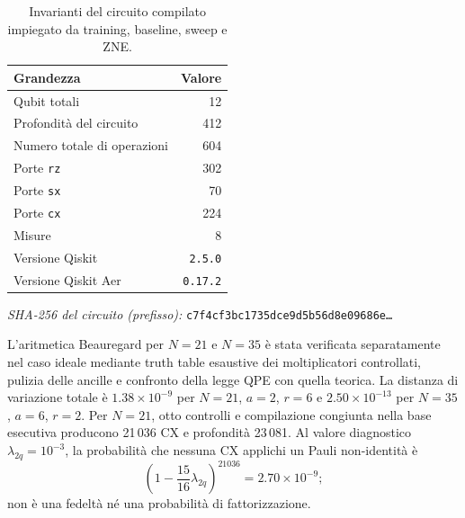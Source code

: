 \begin{onehalfspace}
\begin{table}[H]
\centering

\small
\begin{tabularx}{0.85\textwidth}{@{}>{\raggedright\arraybackslash}Xr@{}}
\toprule
\textbf{Grandezza} & \textbf{Valore} \\
\midrule
Qubit totali & 12 \\
\addlinespace[0.3em]
Profondità del circuito & 412 \\
\addlinespace[0.3em]
Numero totale di operazioni & 604 \\
\addlinespace[0.3em]
Porte \texttt{rz} & 302 \\
\addlinespace[0.3em]
Porte \texttt{sx} & 70 \\
\addlinespace[0.3em]
Porte \texttt{cx} & 224 \\
\addlinespace[0.3em]
Misure & 8 \\
\midrule
Versione Qiskit & \texttt{2.5.0} \\
\addlinespace[0.3em]
Versione Qiskit Aer & \texttt{0.17.2} \\
\bottomrule
\end{tabularx}
\par\smallskip
\begin{minipage}{0.85\textwidth}
\footnotesize{}\raggedright
\textit{SHA-256 del circuito (prefisso):}
\texttt{c7f4cf3bc1735dce9d5b56d8e09686e\ldots}
\end{minipage}
\caption[Contratto riproducibile della campagna N=15]{Invarianti del
circuito compilato impiegato da training, baseline, sweep e ZNE.}\label{tab:correzione_seed}\label{tab:circuit_depth}

\end{table}

L'aritmetica Beauregard per $N=21$ e $N=35$ è stata verificata
separatamente nel caso ideale mediante truth table esaustive dei
moltiplicatori controllati, pulizia delle ancille e confronto della legge
QPE con quella teorica. La distanza di variazione totale è
$1.38\times10^{-9}$ per $N=21$, $a=2$, $r=6$ e
$2.50\times10^{-13}$ per $N=35$, $a=6$, $r=2$. Per $N=21$, otto
controlli e compilazione congiunta nella base esecutiva producono 21\,036
CX e profondità 23\,081. Al valore diagnostico
$\lambda_{2q}=10^{-3}$, la probabilità che nessuna CX applichi un Pauli
non-identità è
\[
  \left(1-\frac{15}{16}\lambda_{2q}\right)^{21036}
  =2.70\times10^{-9};
\]
non è una fedeltà né una probabilità di fattorizzazione.

\begin{table}[H]
\centering


\end{table}
\end{onehalfspace}
